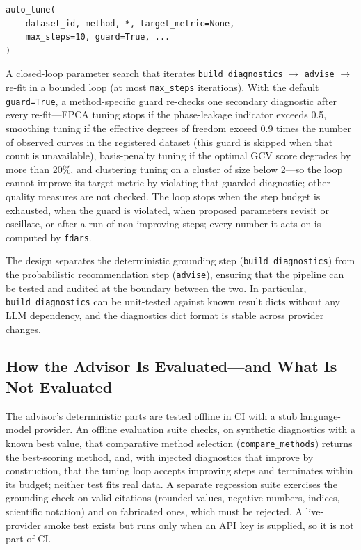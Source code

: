 \begin{lstlisting}[style=fdarsinput]
auto_tune(
    dataset_id, method, *, target_metric=None,
    max_steps=10, guard=True, ...
)
\end{lstlisting}
    A closed-loop parameter search that iterates
    \texttt{build\_diagnostics} $\to$ \texttt{advise} $\to$ re-fit in a
    bounded loop (at most \texttt{max\_steps} iterations).  With the
    default \texttt{guard=True}, a method-specific guard re-checks one
    secondary diagnostic after every re-fit---FPCA tuning stops if the
    phase-leakage indicator exceeds 0.5, smoothing tuning if the effective
    degrees of freedom exceed 0.9 times the number of observed curves in
    the registered dataset (this guard is skipped when that count is
    unavailable), basis-penalty tuning if the optimal
    GCV score degrades by more than 20\%, and clustering tuning on a cluster
    of size below 2---so the loop cannot improve its target metric by
    violating that guarded diagnostic; other quality measures are not
    checked.  The loop stops when the
    step budget is exhausted, when the guard is violated, when proposed
    parameters revisit or oscillate, or after a run of non-improving steps;
    every number it acts on is computed by \texttt{fdars}.

The design separates the deterministic grounding step (\texttt{build\_diagnostics})
from the probabilistic recommendation step (\texttt{advise}), ensuring that
the pipeline can be tested and audited at the boundary between the two.
In particular, \texttt{build\_diagnostics} can be unit-tested against known
result dicts without any LLM dependency, and the diagnostics dict format is
stable across provider changes.

\subsection{How the Advisor Is Evaluated---and What Is Not Evaluated}

The advisor's deterministic parts are tested offline in CI with a stub
language-model provider.  An offline evaluation suite checks, on synthetic
diagnostics with a known best value, that comparative method selection
(\texttt{compare\_methods}) returns the best-scoring method, and, with
injected diagnostics that improve by construction, that the tuning loop
accepts improving steps and terminates within its budget; neither test fits
real data.  A
separate regression suite exercises the grounding check on valid citations
(rounded values, negative numbers, indices, scientific notation) and on
fabricated ones, which must be rejected.  A live-provider smoke test exists
but runs only when an API key is supplied, so it is not part of CI.


